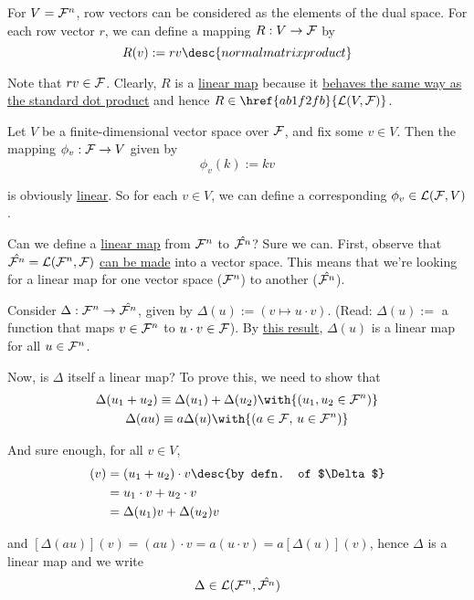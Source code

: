 \Remark{}\label{a7619ae}

For $V=\mathcal F^n$, row vectors can be considered as the elements of the dual space.
For each row vector $r$, we can define a mapping $R:V\to\mathcal F$ by
$$
  R(v):=rv\desc{normal matrix product}
$$

Note that $rv\in\mathcal F$. Clearly, $R$ is a \href{d7d1925}{linear map} because it
\href{dcae040}{behaves the same way as the standard dot product} and hence
$R\in\href{ab1f2fb}{\L(V,\F)}$.

\label{bdff7c3}

Let $V$ be a finite-dimensional vector space over $\mathcal F$, and fix some $v\in V$.
Then the mapping $\phi_v:\mathcal F\to V$ given by
$$
  \phi_v(k):=kv
$$

is obviously \href{d7d1925}{linear}. So for each $v\in V$, we can define a
corresponding $\phi_v\in\mathcal L(\mathcal F,V)$.

\label{d5ae44c}

Can we define a \href{d7d1925}{linear map} from $\mathcal F^n$ to
\href{cb9eede}{$\hat{\mathcal F^n}$}? Sure we can. First, observe that
$\hat{\mathcal F^n}=\mathcal L(\mathcal F^n,\mathcal F)$ \href{e257b42}{can be made} into a vector space. This
means that we're looking for a linear map for one vector space ($\mathcal F^n$) to
another ($\hat{\mathcal F^n}$).

Consider $\Delta:\mathcal F^n\to\hat{\mathcal F^n}$, given by $\Delta(u):=(v\mapsto u\cdot v)$.
(Read: $\Delta(u):=$ a function that maps $v\in\mathcal F^n$ to $u\cdot v\in\mathcal F$). By
\href{dcae040}{this result}, $\Delta(u)$ is a linear map for all $u\in\mathcal F^n$.

Now, is $\Delta$ itself a linear map? To prove this, we need to show that
\begin{gather*}
  \Delta(u_1+u_2)\equiv\Delta(u_1)+\Delta(u_2)\with{(u_1,u_2\in\F^n)} \\
  \Delta(au)\equiv a\Delta(u)\with{(a\in\F,\,u\in\F^n)}
\end{gather*}

And sure enough, for all $v\in V$,
\begin{align*}
  [\Delta(u_1+u_2)](v) &=(u_1+u_2)\cdot v\desc{by defn. of $\Delta$} \\
                       &=u_1\cdot v+u_2\cdot v                       \\
                       &=\Delta(u_1)v+\Delta(u_2)v
\end{align*}

and $[\Delta(au)](v)=(au)\cdot v=a(u\cdot v)=a[\Delta(u)](v)$, hence $\Delta$
is a linear map and we write
$$
  \Delta\in\mathcal L(\mathcal F^n,\hat{\mathcal F^n})
$$


